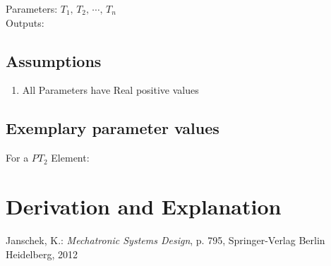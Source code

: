 \documentclass[10pt,a4paper]{article}
\begin{document}
	
	\noindent
	Parameters: $T_1, \, T_2, \, \cdots, \, T_n$ %
	\\
	Outputs: %
	
	\subsection{Assumptions} %
	\begin{enumerate} %
		\item All Parameters have Real positive values
	\end{enumerate}
	
	
	\subsection{Exemplary parameter values}
	For a $PT_2$ Element:\\
	

	
	\section{Derivation and Explanation} %
	
	
	\begin{thebibliography}{10}		
		Janschek, K.: 
		\textit{Mechatronic Systems Design}, p. 795, Springer-Verlag Berlin Heidelberg, 2012
	\end{thebibliography}
\end{document}
